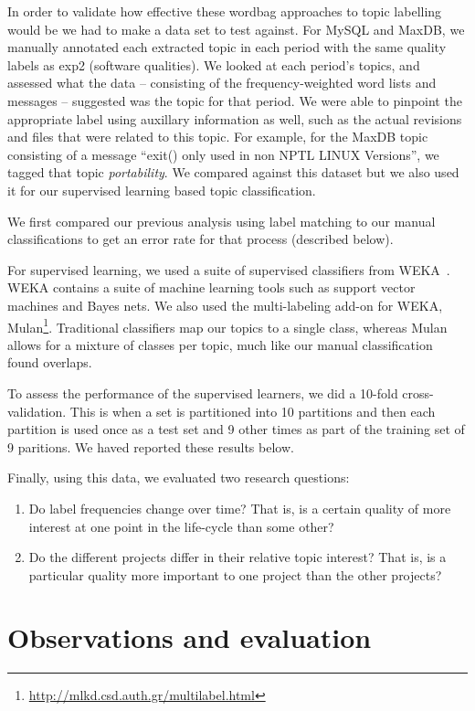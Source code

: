 \documentclass{acm_proc_article-sp}
\begin{document}
In order to validate how effective these wordbag approaches to topic labelling would be we had to make a data set to test against.  For MySQL and MaxDB, we manually annotated each extracted topic in each period with the same quality labels as \textsf{exp2} (software qualities). We looked at each period's topics, and assessed what the data -- consisting of the frequency-weighted word lists and messages -- suggested was the topic for that period. We were able to pinpoint the appropriate label using auxillary information as well, such as the actual revisions and files that were related to this topic. For example, for the MaxDB topic consisting of a message ``exit() only used in non NPTL LINUX Versions'', we tagged that topic \emph{portability}. We compared against this dataset but we also used it for our supervised learning based topic classification.

We first compared our previous analysis using label matching to our manual classifications to get an error rate for that process (described below). 

For supervised learning, we used a suite of supervised classifiers from WEKA~\cite{weka09}. WEKA contains a suite of machine learning tools such as support vector machines and Bayes nets. We also used the multi-labeling add-on for WEKA, Mulan\footnote{\url{http://mlkd.csd.auth.gr/multilabel.html}}. Traditional classifiers map our topics to a single class, whereas Mulan allows for a mixture of classes per topic, much like our manual classification found overlaps. 

To assess the performance of the supervised learners, we did a 10-fold cross-validation. This is when a set is partitioned into 10 partitions and then each partition is used once as a test set and 9 other times as part of the training set of 9 paritions. We haved reported these results below.

Finally, using this data, we evaluated two research questions:
\begin{enumerate}
\item Do label frequencies change over time? That is, is a certain quality of more interest at one point in the life-cycle than some other? 
\item  Do the different projects differ in their relative topic interest? That is, is a particular quality more important to one project than the other projects?  
\end{enumerate}

\section{Observations and evaluation}
\end{document}
